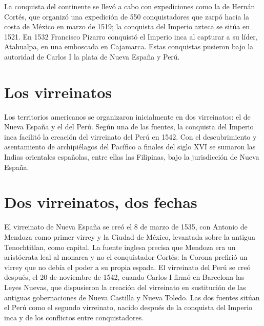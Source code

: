 \documentclass{book}
\begin{document}
La conquista del continente se llevó a cabo con expediciones como la de Hernán Cortés, que organizó una expedición de 550 conquistadores que zarpó hacia la costa de México en marzo de 1519; la conquista del Imperio azteca se sitúa en 1521. En 1532 Francisco Pizarro conquistó el Imperio inca al capturar a su líder, Atahualpa, en una emboscada en Cajamarca. Estas conquistas pusieron bajo la autoridad de Carlos I la plata de Nueva España y Perú.


\section{Los virreinatos}

Los territorios americanos se organizaron inicialmente en dos virreinatos: el de Nueva España y el del Perú. Según una de las fuentes, la conquista del Imperio inca facilitó la creación del virreinato del Perú en 1542. Con el descubrimiento y asentamiento de archipiélagos del Pacífico a finales del siglo XVI se sumaron las Indias orientales españolas, entre ellas las Filipinas, bajo la jurisdicción de Nueva España.


\section{Dos virreinatos, dos fechas}

El virreinato de Nueva España se creó el 8 de marzo de 1535, con Antonio de Mendoza como primer virrey y la Ciudad de México, levantada sobre la antigua Tenochtitlan, como capital. La fuente inglesa precisa que Mendoza era un aristócrata leal al monarca y no el conquistador Cortés: la Corona prefirió un virrey que no debía el poder a su propia espada. El virreinato del Perú se creó después, el 20 de noviembre de 1542, cuando Carlos I firmó en Barcelona las Leyes Nuevas, que dispusieron la creación del virreinato en sustitución de las antiguas gobernaciones de Nueva Castilla y Nueva Toledo. Las dos fuentes sitúan el Perú como el segundo virreinato, nacido después de la conquista del Imperio inca y de los conflictos entre conquistadores.

\end{document}
